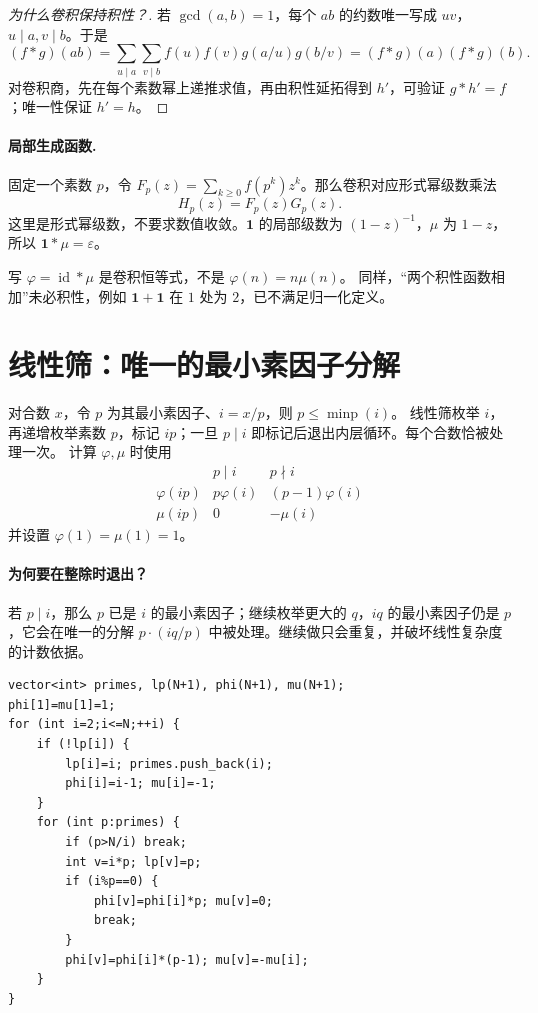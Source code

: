\documentclass[UTF8,a4paper,11pt,oneside,openany,fontset=fandol]{ctexbook}
\theoremstyle{definition}
\newcommand{\eps}{\varepsilon}
\newcommand{\one}{\mathbf 1}
\newcommand{\id}{\operatorname{id}}
\begin{document}
\begin{proof}[为什么卷积保持积性？]
若 $\gcd(a,b)=1$，每个 $ab$ 的约数唯一写成 $uv$，$u\mid a,v\mid b$。于是
\[
 (f*g)(ab)=\sum_{u\mid a}\sum_{v\mid b}f(u)f(v)g(a/u)g(b/v)
 =(f*g)(a)(f*g)(b).
\]
对卷积商，先在每个素数幂上递推求值，再由积性延拓得到 $h'$，可验证 $g*h'=f$；唯一性保证 $h'=h$。
\end{proof}
\paragraph{局部生成函数.}
固定一个素数 $p$，令 $F_p(z)=\sum_{k\ge0}f(p^k)z^k$。那么卷积对应形式幂级数乘法
\[
 H_p(z)=F_p(z)G_p(z).
\]
这里是形式幂级数，不要求数值收敛。$\one$ 的局部级数为 $(1-z)^{-1}$，$\mu$ 为 $1-z$，所以 $\one*\mu=\eps$。
\begin{pitfall}
写 $\varphi=\id*\mu$ 是卷积恒等式，不是 $\varphi(n)=n\mu(n)$。
同样，“两个积性函数相加”未必积性，例如 $\one+\one$ 在 $1$ 处为 $2$，已不满足归一化定义。
\end{pitfall}


\section{线性筛：唯一的最小素因子分解}
对合数 $x$，令 $p$ 为其最小素因子、$i=x/p$，则 $p\le\operatorname{minp}(i)$。
线性筛枚举 $i$，再递增枚举素数 $p$，标记 $ip$；一旦 $p\mid i$ 即标记后退出内层循环。每个合数恰被处理一次。
计算 $\varphi,\mu$ 时使用
\[
\begin{array}{c|cc}
 &p\mid i&p\nmid i\\\hline
\varphi(ip)&p\varphi(i)&(p-1)\varphi(i)\\
\mu(ip)&0&-\mu(i)
\end{array}
\]
并设置 $\varphi(1)=\mu(1)=1$。


\paragraph{为何要在整除时退出？}
若 $p\mid i$，那么 $p$ 已是 $i$ 的最小素因子；继续枚举更大的 $q$，$iq$ 的最小素因子仍是 $p$，它会在唯一的分解 $p\cdot(iq/p)$ 中被处理。继续做只会重复，并破坏线性复杂度的计数依据。
\begin{lstlisting}
vector<int> primes, lp(N+1), phi(N+1), mu(N+1);
phi[1]=mu[1]=1;
for (int i=2;i<=N;++i) {
    if (!lp[i]) {
        lp[i]=i; primes.push_back(i);
        phi[i]=i-1; mu[i]=-1;
    }
    for (int p:primes) {
        if (p>N/i) break;
        int v=i*p; lp[v]=p;
        if (i%p==0) {
            phi[v]=phi[i]*p; mu[v]=0;
            break;
        }
        phi[v]=phi[i]*(p-1); mu[v]=-mu[i];
    }
}
\end{lstlisting}
\end{document}
